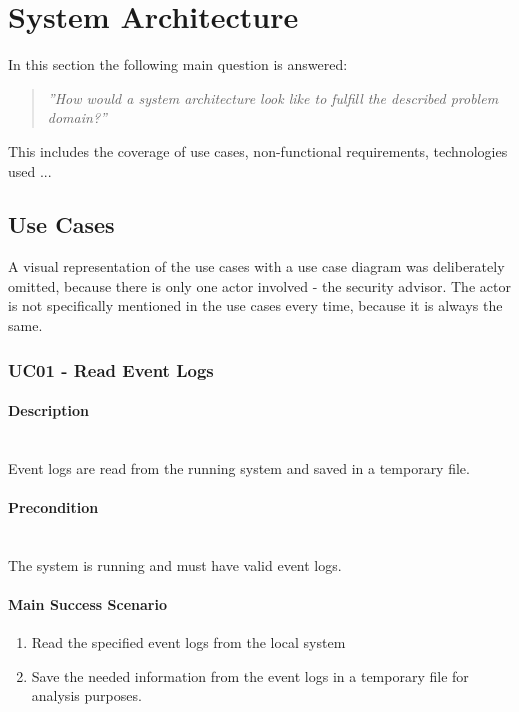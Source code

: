 \section{System Architecture}
In this section the following main question is answered: 
\begin{quotation}
    \textit{''How would a system architecture look like to fulfill the described problem domain?''}
\end{quotation}
This includes the coverage of use cases, non-functional requirements, technologies used ...

\subsection{Use Cases}
A visual representation of the use cases with a use case diagram was deliberately omitted, because there is only one actor involved - the security advisor. The actor is not specifically mentioned in the use cases every time, because it is always the same.

\subsubsection{UC01 - Read Event Logs}
\begin{tcolorbox}
    \paragraph{Description} \ \\
    Event logs are read from the running system and saved in a temporary file.
    \ \\
    \paragraph{Precondition} \ \\
    The system is running and must have valid event logs.
    \ \\
    \paragraph{Main Success Scenario} 
    \begin{enumerate}
        \item Read the specified event logs from the local system
        \item Save the needed information from the event logs in a temporary file for analysis purposes.
    \end{enumerate}
\end{tcolorbox}


